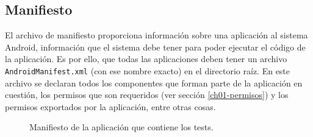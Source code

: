 \subsection{Manifiesto}
El archivo de manifiesto proporciona información sobre una aplicación al sistema Android, información que el sistema debe tener para poder ejecutar el código de la aplicación. Es por ello, que todas las aplicaciones deben tener un archivo \texttt{AndroidManifest.xml} (con ese nombre exacto) en el directorio raíz. En este archivo se declaran todos los componentes que forman parte de la aplicación en cuestión, los permisos que son requeridos (ver sección \ref{ch01-permisos}) y los permisos exportados por la aplicación, entre otras cosas.
\begin{figure}[hbtp]
    \centering
    
    \caption{Manifiesto de la aplicación que contiene los tests.}
    \label{fig:ch01:manifest}
\end{figure}